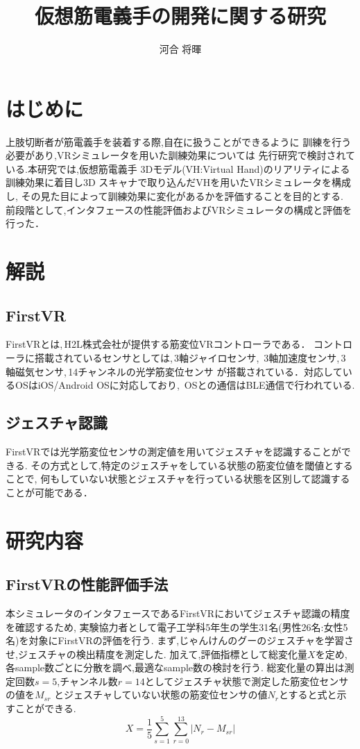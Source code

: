 \documentclass{ltjsarticle}
\title{仮想筋電義手の開発に関する研究}
\author{河合 将暉}
\begin{document}
\maketitle

\section{はじめに}
	上肢切断者が筋電義手を装着する際,自在に扱うことができるように
	訓練を行う必要があり,VRシミュレータを用いた訓練効果については
	先行研究\cite{ref:1}で検討されている.本研究では,仮想筋電義手
	3Dモデル(VH:Virtual Hand)のリアリティによる訓練効果に着目し3D
	スキャナで取り込んだVHを用いたVRシミュレータを構成し,
	その見た目によって訓練効果に変化があるかを評価することを目的とする.
	前段階として,インタフェースの性能評価およびVRシミュレータの構成と評価を行った．
\section{解説}
	\subsection{FirstVR}
		FirstVR\cite{ref:2}とは,\,H2L株式会社が提供する筋変位VRコントローラである．
		コントローラに搭載されているセンサとしては,\,3軸ジャイロセンサ,\,
		3軸加速度センサ,\,3軸磁気センサ,\,14チャンネルの光学筋変位センサ
		が搭載されている．対応しているOSはiOS/Android OSに対応しており,\,
		OSとの通信はBLE通信で行われている.

	\subsection{ジェスチャ認識}
		FirstVRでは光学筋変位センサの測定値を用いてジェスチャを認識することができる.
		その方式として,特定のジェスチャをしている状態の筋変位値を閾値とすることで,
		何もしていない状態とジェスチャを行っている状態を区別して認識することが可能である．

\section{研究内容}
	\subsection{FirstVRの性能評価手法}
		本シミュレータのインタフェースであるFirstVRにおいてジェスチャ認識の精度を確認するため,
		実験協力者として電子工学科5年生の学生31名(男性26名:女性5名)を対象にFirstVRの評価を行う.
		まず,じゃんけんのグーのジェスチャを学習させ,ジェスチャの検出精度を測定した.
		加えて,評価指標として総変化量$X$を定め,各sample数ごとに分散を調べ,最適なsample数の検討を行う.
		総変化量の算出は測定回数$s = 5$,チャンネル数$r = 14$としてジェスチャ状態で測定した筋変位センサの値を$M_{{s}{r}}$
		とジェスチャしていない状態の筋変位センサの値$N_{r}$とすると式と示すことができる.
		\begin{equation}
			\label{eq:originaldata}
			X = \frac{1}{5} \sum_{s = 1}^{5} \sum_{r = 0}^{13} |N_{r} - M_{{s}{r}}|
		\end{equation}
		
\end{document}
